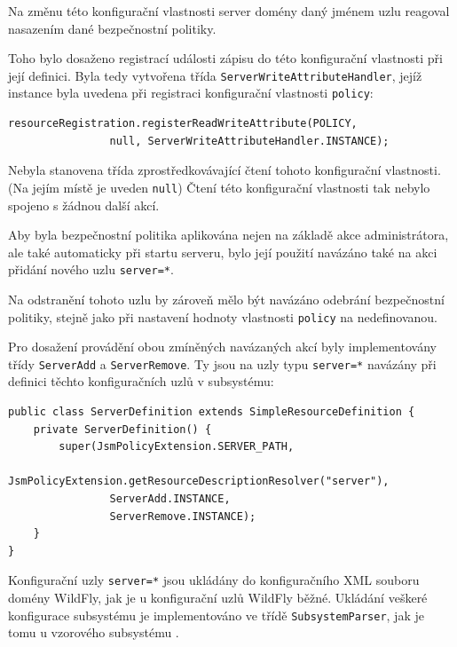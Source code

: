 Na změnu této konfigurační vlastnosti server domény daný jménem uzlu reagoval nasazením dané bezpečnostní politiky.

Toho bylo dosaženo registrací události zápisu do této konfigurační vlastnosti při její definici.
Byla tedy vytvořena třída {\tt ServerWriteAttributeHandler}, jejíž instance byla uvedena při registraci konfigurační vlastnosti {\tt policy}:

\begin{lstlisting}[caption=Registrace konfigurační vlastnosti {\tt policy} uzlu {\tt server=*}, label=registraceAtributu]
resourceRegistration.registerReadWriteAttribute(POLICY,
                null, ServerWriteAttributeHandler.INSTANCE);
\end{lstlisting}

Nebyla stanovena třída zprostředkovávající čtení tohoto konfigurační vlastnosti. (Na jejím místě je uveden {\tt null}) Čtení této konfigurační vlastnosti tak nebylo spojeno s žádnou další akcí.

Aby byla bezpečnostní politika aplikována nejen na základě akce administrátora, ale také automaticky při startu serveru, bylo její použití navázáno také na akci přidání nového uzlu {\tt server=*}.

Na odstranění tohoto uzlu by zároveň mělo být navázáno odebrání bezpečnostní politiky, stejně jako při nastavení hodnoty vlastnosti {\tt policy} na nedefinovanou.

Pro dosažení provádění obou zmíněných navázaných akcí byly implementovány třídy {\tt ServerAdd} a {\tt ServerRemove}.
Ty jsou na uzly typu {\tt server=*} navázány při definici těchto konfiguračních uzlů v subsystému:

\begin{lstlisting}[caption=Definice konfiguračního uzlu {\tt server=*}, label=registraceUzluServer]
public class ServerDefinition extends SimpleResourceDefinition {
    private ServerDefinition() {
        super(JsmPolicyExtension.SERVER_PATH,
                JsmPolicyExtension.getResourceDescriptionResolver("server"),
                ServerAdd.INSTANCE,
                ServerRemove.INSTANCE);
    }
}
\end{lstlisting}

Konfigurační uzly {\tt server=*} jsou ukládány do konfiguračního XML souboru domény WildFly, jak je u konfigurační uzlů WildFly běžné.
Ukládání veškeré konfigurace subsystému je implementováno ve třídě {\tt SubsystemParser}, jak je tomu u vzorového subsystému \cite{WildFlyExtending}.

